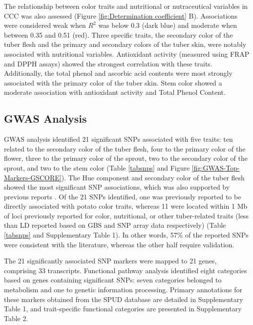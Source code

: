 \documentclass[pdflatex,sn-mathphys-ay]{sn-jnl}%
\begin{document}
The relationship between color traits and nutritional or nutraceutical variables in CCC was also assessed (Figure \ref{fig:Determination coefficient} B). Associations were considered weak when $R^2$ was below 0.3 (dark blue) and moderate when between 0.35 and 0.51 (red). Three specific traits, the secondary color of the tuber flesh and the primary and secondary colors of the tuber skin, were notably associated with nutritional variables. Antioxidant activity (measured using FRAP and DPPH assays) showed the strongest correlation with these traits. Additionally, the total phenol and ascorbic acid contents were most strongly associated with the primary color of the tuber skin. Stem color showed a moderate association with antioxidant activity and Total Phenol Content.


\subsection{GWAS  Analysis}


 GWAS analysis identified 21 significant SNPs associated with five traits: ten related to the secondary color of the tuber flesh, four to the primary color of the flower,  three to the primary color of the sprout, two to the secondary color of the sprout, and two to the stem color (Table \ref{tabsnps} and Figure \ref{fig:GWAS-Top-Markers-GSCORE}). The Hue component and secondary color of the tuber flesh showed the most significant SNP associations, which was also supported by previous reports \citep{pandey2022genomic,riveros2022uncovering,sharma2024genotyping,parra2019chromosomes}. Of the 21 SNPs identified, one was previously reported to be directly associated with potato color traits, whereas 11 were located within 1 Mb of loci  previously reported for color, nutritional, or other tuber-related traits (less than LD reported based on GBS and SNP array data respectively\citep{sharma2024genotyping,Berdugo2017}) (Table \ref{tabsnps} and  Supplementary Table 1). In other words, 57\% of the reported SNPs were consistent with the literature, whereas the other half require validation.   

The 21 significantly associated SNP markers were mapped to 21 genes, comprising 33 transcripts. Functional pathway analysis identified eight categories based on genes containing significant SNPs: seven categories belonged to metabolism and one to genetic information processing. Primary annotations for these markers obtained from the SPUD database are detailed in Supplementary Table 1, and trait-specific functional categories are presented in Supplementary Table 2. 
\end{document}
